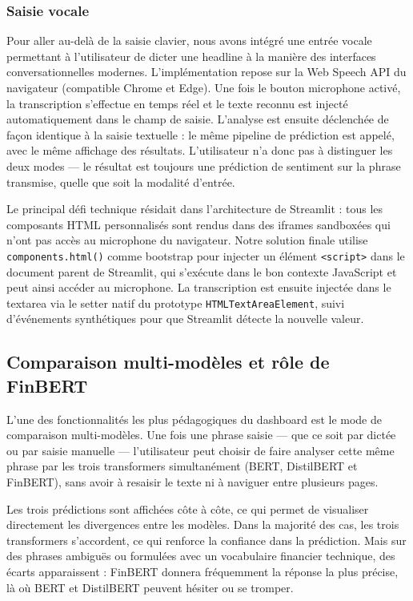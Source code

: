 \documentclass[12pt, a4paper]{article}
\begin{document}
\subsubsection{Saisie vocale}

Pour aller au-delà de la saisie clavier, nous avons intégré une entrée vocale
permettant à l'utilisateur de dicter une headline à la manière des interfaces
conversationnelles modernes. L'implémentation repose sur la Web Speech API du
navigateur (compatible Chrome et Edge). Une fois le bouton microphone activé,
la transcription s'effectue en temps réel et le texte reconnu est injecté
automatiquement dans le champ de saisie. L'analyse est ensuite déclenchée de
façon identique à la saisie textuelle : le même pipeline de prédiction est appelé,
avec le même affichage des résultats. L'utilisateur n'a donc pas à distinguer les
deux modes --- le résultat est toujours une prédiction de sentiment sur la phrase
transmise, quelle que soit la modalité d'entrée.

Le principal défi technique résidait dans l'architecture de Streamlit : tous les
composants HTML personnalisés sont rendus dans des iframes sandboxées qui n'ont pas
accès au microphone du navigateur. Notre solution finale utilise
\texttt{components.html()} comme bootstrap pour injecter un élément \texttt{<script>}
dans le document parent de Streamlit, qui s'exécute dans le bon contexte JavaScript
et peut ainsi accéder au microphone. La transcription est ensuite injectée dans le
textarea via le setter natif du prototype \texttt{HTMLTextAreaElement}, suivi
d'événements synthétiques pour que Streamlit détecte la nouvelle valeur.

\subsection{Comparaison multi-modèles et rôle de FinBERT}

L'une des fonctionnalités les plus pédagogiques du dashboard est le mode de
comparaison multi-modèles. Une fois une phrase saisie --- que ce soit par dictée
ou par saisie manuelle --- l'utilisateur peut choisir de faire analyser cette même
phrase par les trois transformers simultanément (BERT, DistilBERT et FinBERT),
sans avoir à resaisir le texte ni à naviguer entre plusieurs pages.

Les trois prédictions sont affichées côte à côte, ce qui permet de visualiser
directement les divergences entre les modèles. Dans la majorité des cas, les trois
transformers s'accordent, ce qui renforce la confiance dans la prédiction. Mais
sur des phrases ambiguës ou formulées avec un vocabulaire financier technique, des
écarts apparaissent : FinBERT donnera fréquemment la réponse la plus précise, là
où BERT et DistilBERT peuvent hésiter ou se tromper.
\end{document}
